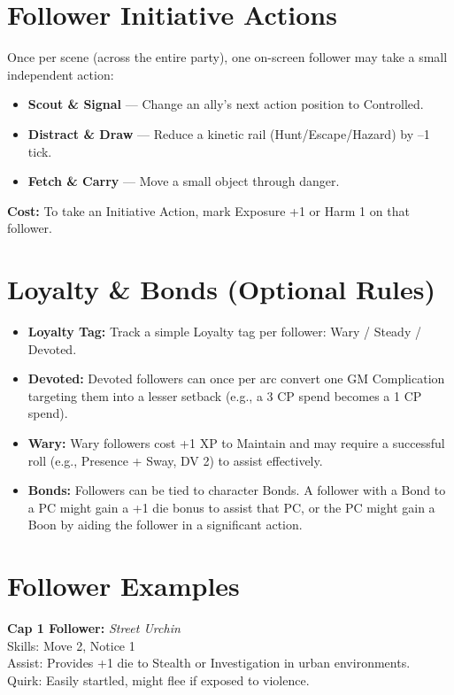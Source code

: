 \section{Follower Initiative Actions}

Once per scene (across the entire party), one on-screen follower may take a small independent action:

\begin{itemize}
  \item \textbf{Scout \& Signal} — Change an ally's next action position to Controlled.
  \item \textbf{Distract \& Draw} — Reduce a kinetic rail (Hunt/Escape/Hazard) by –1 tick.
  \item \textbf{Fetch \& Carry} — Move a small object through danger.
\end{itemize}

\textbf{Cost:} To take an Initiative Action, mark Exposure +1 or Harm 1 on that follower.

\section{Loyalty \& Bonds (Optional Rules)}

\begin{itemize}
  \item \textbf{Loyalty Tag:} Track a simple Loyalty tag per follower: Wary / Steady / Devoted.
  \item \textbf{Devoted:} Devoted followers can once per arc convert one GM Complication targeting them into a lesser setback (e.g., a 3 CP spend becomes a 1 CP spend).
  \item \textbf{Wary:} Wary followers cost +1 XP to Maintain and may require a successful roll (e.g., Presence + Sway, DV 2) to assist effectively.
  \item \textbf{Bonds:} Followers can be tied to character Bonds. A follower with a Bond to a PC might gain a +1 die bonus to assist that PC, or the PC might gain a Boon by aiding the follower in a significant action.
\end{itemize}

\section{Follower Examples}

\textbf{Cap 1 Follower:} \textit{Street Urchin} \\
Skills: Move 2, Notice 1 \\
Assist: Provides +1 die to Stealth or Investigation in urban environments. \\
Quirk: Easily startled, might flee if exposed to violence.

